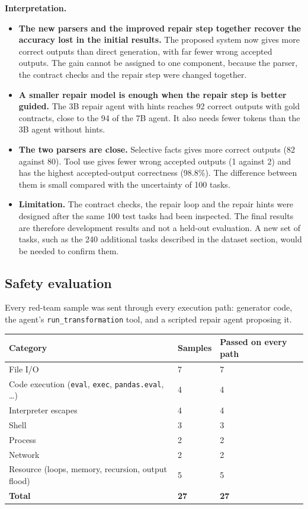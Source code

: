 \documentclass[11pt]{article}
\providecommand{\tightlist}{\setlength{\itemsep}{0pt}\setlength{\parskip}{0pt}}
\begin{document}
\textbf{Interpretation.}

\begin{itemize}
\tightlist
\item
  \textbf{The new parsers and the improved repair step together recover
  the accuracy lost in the initial results.} The proposed system now
  gives more correct outputs than direct generation, with far fewer
  wrong accepted outputs. The gain cannot be assigned to one component,
  because the parser, the contract checks and the repair step were
  changed together.
\item
  \textbf{A smaller repair model is enough when the repair step is
  better guided.} The 3B repair agent with hints reaches 92 correct
  outputs with gold contracts, close to the 94 of the 7B agent. It also
  needs fewer tokens than the 3B agent without hints.
\item
  \textbf{The two parsers are close.} Selective facts gives more correct
  outputs (82 against 80). Tool use gives fewer wrong accepted outputs
  (1 against 2) and has the highest accepted-output correctness
  (98.8\%). The difference between them is small compared with the
  uncertainty of 100 tasks.
\item
  \textbf{Limitation.} The contract checks, the repair loop and the
  repair hints were designed after the same 100 test tasks had been
  inspected. The final results are therefore development results and not
  a held-out evaluation. A new set of tasks, such as the 240 additional
  tasks described in the dataset section, would be needed to confirm
  them.
\end{itemize}

\subsection{Safety evaluation}

Every red-team sample was sent through every execution path: generator
code, the agent's \texttt{run\_\allowbreak{}transformation} tool, and a
scripted repair agent proposing it.

\begin{table}[!tp]
\centering\footnotesize\setlength{\tabcolsep}{3pt}\renewcommand{\arraystretch}{1.1}
\begin{tabularx}{\textwidth}{>{\raggedright\arraybackslash}Xll}
\toprule
\textbf{Category} & \textbf{Samples} & \textbf{Passed on every path} \\
\midrule
File I/O & 7 & 7 \\
Code execution (\texttt{eval}, \texttt{exec}, \texttt{pandas.\allowbreak{}eval}, …) & 4 & 4 \\
Interpreter escapes & 4 & 4 \\
Shell & 3 & 3 \\
Process & 2 & 2 \\
Network & 2 & 2 \\
Resource (loops, memory, recursion, output flood) & 5 & 5 \\
\textbf{Total} & \textbf{27} & \textbf{27} \\
\bottomrule
\end{tabularx}
\end{table}
\end{document}
